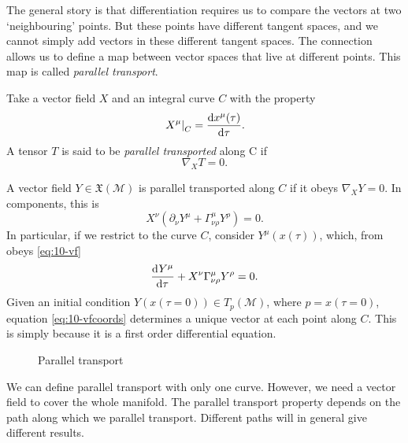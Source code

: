 The general story is that differentiation requires us to compare the vectors at two `neighbouring' points. But these points have different tangent spaces, and we cannot simply add vectors in these different tangent spaces.
The connection allows us to define a map between vector spaces that live at different points. This map is called \emph{parallel transport}.
\begin{definition}
  Take a vector field $X$ and an integral curve $C$ with the property
  \begin{equation}
    \left.X^\mu\right\rvert_C = \dv{x^\mu(\tau)}{\tau}.
  \end{equation}
  A tensor $T$ is said to be \emph{parallel transported} along C if
  \begin{equation}
    \nabla_{X} T = 0.
  \end{equation}
\end{definition}
\begin{example}[]
  A vector field $Y \in \mathfrak{X}(\mathcal{M})$ is parallel transported along $C$ if it obeys $\nabla_{X} Y = 0$. In components, this is
  \begin{equation}
    \label{eq:10-vf}
    X^\nu(\partial_\nu Y^\mu + \Gamma^\mu_{\nu\rho} Y^\rho) = 0.
  \end{equation}
  In particular, if we restrict to the curve $C$, consider $Y^\mu(x(\tau))$, which, from obeys \eqref{eq:10-vf}
  \begin{equation}
    \label{eq:10-vfcoords}
    \dv[]{Y^\mu}{\tau} + X^\nu \Gamma^\mu_{\nu\rho} Y^\rho = 0.
  \end{equation}
  Given an initial condition $Y(x(\tau=0)) \in T_p(\mathcal{M})$, where $p = x(\tau=0)$, equation \eqref{eq:10-vfcoords} determines a unique vector at each point along $C$. This is simply because it is a first order differential equation.
  \begin{figure}[tbhp]
    \centering
    \def\svgwidth{0.4\columnwidth}
    
    \caption{Parallel transport}
    \label{fig:l10f1}
  \end{figure}
\end{example}
\begin{leftbar}
  \begin{remark}
    We can define parallel transport with only one curve. However, we need a vector field to cover the whole manifold.
    The parallel transport property depends on the path along which we parallel transport. Different paths will in general give different results.
  \end{remark}
\end{leftbar}

